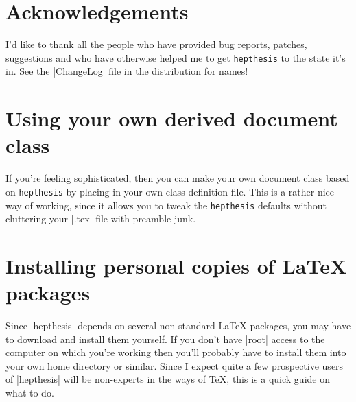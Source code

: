 \documentclass[12pt]{scrartcl}
\newcommand{\hepthesis}{\texttt{hepthesis}\xspace}
\newenvironment{snippet}{\Verbatim}{\endVerbatim}
\begin{document}
\section{Acknowledgements}
I'd like to thank all the people who have provided bug reports, patches, suggestions
and who have otherwise helped me to get \hepthesis to the state it's in. See the
|ChangeLog| file in the distribution for names!


\appendix

\section{Using your own derived document class}
\label{app:DerivedClass}
If you're feeling sophisticated, then you can make your own document class based on
\hepthesis by placing
%
\begin{snippet}
\end{snippet}
%
in your own class definition file. This is a rather nice way of working, since
it allows you to tweak the \hepthesis defaults without cluttering your
|.tex| file with preamble junk.


\section{Installing personal copies of \LaTeX{} packages}
\label{app:InstallingPackages}
Since |hepthesis| depends on several non-standard \LaTeX{} packages, you may have to
download and install them yourself. If you don't have |root| access to the computer
on which you're working then you'll probably have to install them into your own home
directory or similar. Since I expect quite a few prospective users of |hepthesis| will
be non-experts in the ways of \TeX{}, this is a quick guide on what to do.
\end{document}

